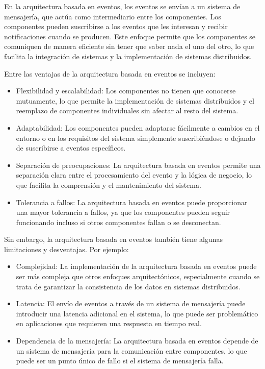 \documentclass[executivepaper]{article}
\begin{document}
En la arquitectura basada en eventos, los eventos se envían a un sistema de mensajería, que actúa como intermediario entre los componentes. Los componentes pueden suscribirse a los eventos que les interesan y recibir notificaciones cuando se producen. Este enfoque permite que los componentes se comuniquen de manera eficiente sin tener que saber nada el uno del otro, lo que facilita la integración de sistemas y la implementación de sistemas distribuidos.

Entre las ventajas de la arquitectura basada en eventos se incluyen:

\begin{itemize}
\item Flexibilidad y escalabilidad: Los componentes no tienen que conocerse mutuamente, lo que permite la implementación de sistemas distribuidos y el reemplazo de componentes individuales sin afectar al resto del sistema.
\item Adaptabilidad: Los componentes pueden adaptarse fácilmente a cambios en el entorno o en los requisitos del sistema simplemente suscribiéndose o dejando de suscribirse a eventos específicos.
\item Separación de preocupaciones: La arquitectura basada en eventos permite una separación clara entre el procesamiento del evento y la lógica de negocio, lo que facilita la comprensión y el mantenimiento del sistema.
\item Tolerancia a fallos: La arquitectura basada en eventos puede proporcionar una mayor tolerancia a fallos, ya que los componentes pueden seguir funcionando incluso si otros componentes fallan o se desconectan.
\end{itemize}

Sin embargo, la arquitectura basada en eventos también tiene algunas limitaciones y desventajas. Por ejemplo:

\begin{itemize}
\item Complejidad: La implementación de la arquitectura basada en eventos puede ser más compleja que otros enfoques arquitectónicos, especialmente cuando se trata de garantizar la consistencia de los datos en sistemas distribuidos.
\item Latencia: El envío de eventos a través de un sistema de mensajería puede introducir una latencia adicional en el sistema, lo que puede ser problemático en aplicaciones que requieren una respuesta en tiempo real.
\item Dependencia de la mensajería: La arquitectura basada en eventos depende de un sistema de mensajería para la comunicación entre componentes, lo que puede ser un punto único de fallo si el sistema de mensajería falla.
\end{itemize}
\end{document}
